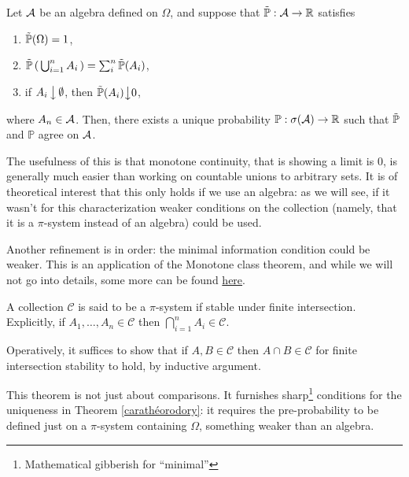 \goodbreak\begin{my_lemma}
	Let $\mathcal{A}$ be an algebra defined on $\Omega$, and suppose that $\tilde{\mathbb{P}}:\mathcal{A}\to\mathbb{R}$ satisfies
	\begin{enumerate}
		\item $\tilde{\mathbb{P}}(\Omega)=1$,
		\item $\tilde{\mathbb{P}} \left( \, \bigcup^n_{i=1} A_i \, \right) = \sum^n_i \tilde{\mathbb{P}}(A_i)$,
		\item if $A_i \, \big \downarrow \, \emptyset$, then $\tilde{\mathbb{P}}(A_i) \big \downarrow0$,
	\end{enumerate}
	where $A_n\in\mathcal{A}$.
	Then, there exists a unique probability $\mathbb{P}: \sigma ( \mathcal{A} ) \to \mathbb{R}$ such that $\tilde{\mathbb{P}}$ and $\mathbb{P}$ agree on $\mathcal{A}$.
\end{my_lemma}
\begin{my_remark}
	The usefulness of this is that monotone continuity, that is showing a limit is $0$, is generally much easier than working on countable unions to arbitrary sets. It is of theoretical interest that this only holds if we use an algebra: as we will see, if it wasn't for this characterization weaker conditions on the collection (namely, that it is a $\pi$-system instead of an algebra) could be used.
\end{my_remark}

Another refinement is in order: the minimal information condition could be weaker. This is an application of the Monotone class theorem, and while we will not go into details, some more can be found \href{http://theanalysisofdata.com/probability/E_3.html}{here}.

\begin{my_definition}[$\pi$-system]
	A collection $\mathcal{C}$ is said to be a $\pi$-system if stable under finite intersection. Explicitly, if $A_1, \dots, A_n \in \mathcal{C}$ then $\bigcap^n_{i=1} A_i \in \mathcal{C}$.
\end{my_definition}
\begin{my_remark}
	Operatively, it suffices to show that if $A,B \in \mathcal{C}$ then $A \cap B \in \mathcal{C}$ for finite intersection stability to hold, by inductive argument.
\end{my_remark}
\begin{my_lemma}[]
\end{my_lemma}

This theorem is not just about comparisons. It furnishes sharp\footnote{Mathematical gibberish for ``minimal''} conditions for the uniqueness in Theorem \ref{carathéorodory}: it requires the pre-probability to be defined just on a $\pi$-system containing $\Omega$, something weaker than an algebra.

